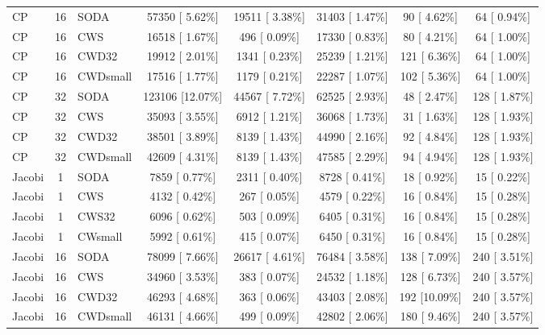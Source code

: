 \begin{table}
\begin{tabular*}{\textwidth}{ l c l c c c c c}
 \hline

CP & 16 & SODA &  57350 [ 5.62\%] &  19511 [ 3.38\%] &   31403 [ 1.47\%] &   90 [ 4.62\%] &     64 [ 0.94\%] \\
CP &  16 & CWS & 16518 [ 1.67\%] &    496 [ 0.09\%] &   17330 [ 0.83\%] &   80 [ 4.21\%] &    64 [ 1.00\%] \\
CP & 16 & CWD32 &  19912 [ 2.01\%] &   1341 [ 0.23\%] &   25239 [ 1.21\%] &  121 [ 6.36\%] &     64 [ 1.00\%] \\
CP & 16 & CWDsmall & 17516 [ 1.77\%] &   1179 [ 0.21\%] &   22287 [ 1.07\%] &  102 [ 5.36\%] &     64 [ 1.00\%] \\

 
 \hline

CP & 32 & SODA &  123106 [12.07\%] &  44567 [ 7.72\%] &   62525 [ 2.93\%] &   48 [ 2.47\%] &  128 [ 1.87\%] \\
CP & 32 & CWS &  35093 [ 3.55\%] &   6912 [ 1.21\%] &   36068 [ 1.73\%] &   31 [ 1.63\%] &    128 [ 1.93\%] \\
CP & 32 & CWD32 &  38501 [ 3.89\%] &   8139 [ 1.43\%] &   44990 [ 2.16\%] &   92 [ 4.84\%] &    128 [ 1.93\%] \\
CP & 32 & CWDsmall &  42609 [ 4.31\%] &   8139 [ 1.43\%] &   47585 [ 2.29\%] &   94 [ 4.94\%] &     128 [ 1.93\%] \\

\thickhline
 
 Jacobi &  1 & SODA &  7859 [ 0.77\%] &   2311 [ 0.40\%] &    8728 [ 0.41\%] &   18 [ 0.92\%] &     15 [ 0.22\%] \\
 Jacobi & 1 & CWS &  4132 [ 0.42\%] &    267 [ 0.05\%] &    4579 [ 0.22\%] &   16 [ 0.84\%] &    15 [ 0.28\%] \\
 Jacobi & 1 & CWS32 &  6096 [ 0.62\%] &    503 [ 0.09\%] &    6405 [ 0.31\%] &   16 [ 0.84\%] &   15 [ 0.28\%] \\
 Jacobi &  1 & CWsmall & 5992 [ 0.61\%] &    415 [ 0.07\%] &    6450 [ 0.31\%] &   16 [ 0.84\%] &   15 [ 0.28\%] \\
 \hline
 
 Jacobi & 16 & SODA &  78099 [ 7.66\%] &  26617 [ 4.61\%] &   76484 [ 3.58\%] &  138 [ 7.09\%] &   240 [ 3.51\%] \\
 Jacobi & 16 & CWS & 34960 [ 3.53\%] &    383 [ 0.07\%] &   24532 [ 1.18\%] &  128 [ 6.73\%] &    240 [ 3.57\%] \\
 Jacobi & 16 & CWD32 & 46293 [ 4.68\%] &    363 [ 0.06\%] &   43403 [ 2.08\%] &  192 [10.09\%] &    240 [ 3.57\%] \\
 Jacobi & 16 & CWDsmall & 46131 [ 4.66\%] &    499 [ 0.09\%] &   42802 [ 2.06\%] &  180 [ 9.46\%] &   240 [ 3.57\%] \\
 

\end{tabular*}
\end{table}
